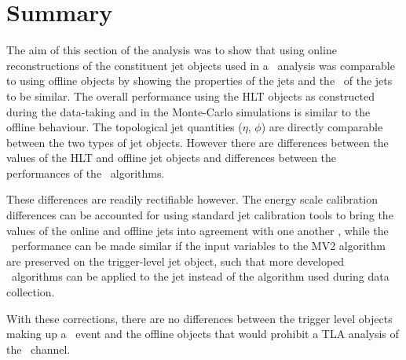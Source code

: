 	\section{Summary}

	The aim of this section of the analysis was to show that using online reconstructions of the constituent jet objects used in a \VBFHBB\ analysis was comparable to using offline objects by showing the properties of the jets and the \btag\ of the jets to be similar. The overall performance using the HLT objects as constructed during the data-taking and in the Monte-Carlo simulations is similar to the offline behaviour. The topological jet quantities ($\eta$, $\phi$) are directly comparable between the two types of jet objects. However there are differences between the \pt values of the HLT and offline jet objects and differences between the performances of the \btag\ algorithms.

	These differences are readily rectifiable however. The energy scale calibration differences can be accounted for using standard jet calibration tools to bring the \pt values of the online and offline jets into agreement with one another \cite{JES}, while the \btag\ performance can be made similar if the input variables to the MV2 algorithm are preserved on the trigger-level jet object, such that more developed \btag\ algorithms can be applied to the jet instead of the algorithm used during data collection.

	With these corrections, there are no differences between the trigger level objects making up a \VBFHBB\ event and the offline objects that would prohibit a TLA analysis of the \VBFHBB\ channel.

\endinput

